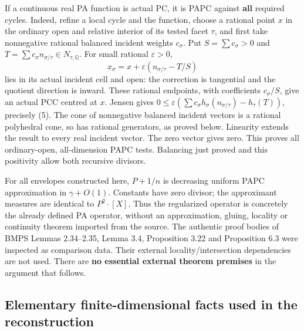 \documentclass[
  11pt,
]{article}
\begin{document}
If a continuous real PA function is actual PC, it is PAPC against
\textbf{all} required cycles. Indeed, refine a local cycle and the
function, choose a rational point \(x\) in the ordinary open and
relative interior of its tested facet \(\tau\), and first take
nonnegative rational balanced incident weights \(c_\sigma\). Put
\(S=\sum c_\sigma>0\) and
\(T=\sum c_\sigma n_{\sigma/\tau}\in N_{\tau,\mathbb{Q}}\). For small
rational \(\varepsilon>0\), \[
 x_\sigma=x+\varepsilon(n_{\sigma/\tau}-T/S)
\] lies in its actual incident cell and open: the correction is
tangential and the quotient direction is inward. These rational
endpoints, with coefficients \(c_\sigma/S\), give an actual PCC centred
at \(x\). Jensen gives
\(0\leq\varepsilon(\sum c_\sigma h_\sigma(n_{\sigma/\tau})-h_\tau(T))\),
precisely (5). The cone of nonnegative balanced incident vectors is a
rational polyhedral cone, so has rational generators, as proved below.
Linearity extends the result to every real incident vector. The zero
vector gives zero. This proves all ordinary-open, all-dimension PAPC
tests. Balancing just proved and this positivity allow both recursive
divisors.

For all envelopes constructed here, \(P+1/n\) is decreasing uniform PAPC
approximation in \(\gamma+O(1)\). Constants have zero divisor; the
approximant measures are identical to \(P^2\cdot[X]\). Thus the
regularized operator is concretely the already defined PA operator,
without an approximation, gluing, locality or continuity theorem
imported from the source. The authentic proof bodies of BMPS Lemmas
2.34--2.35, Lemma 3.4, Proposition 3.22 and Proposition 6.3 were
inspected as comparison data. Their external locality/intersection
dependencies are not used. There are \textbf{no essential external
theorem premises} in the argument that follows.

\subsection{Elementary finite-dimensional facts used in the
reconstruction}\label{elementary-finite-dimensional-facts-used-in-the-reconstruction}
\end{document}
